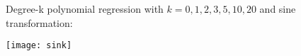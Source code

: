 \begin{answer}

 \graphicspath{ {./featuremaps/} }

Degree-k polynomial regression with $k=0,1,2,3,5,10,20$ and sine transformation:

\texttt{[image: sink]}

\end{answer}
